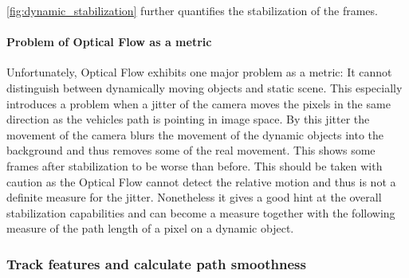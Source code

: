 \autoref{fig:dynamic_stabilization} further quantifies the stabilization of the frames.

\paragraph{Problem of Optical Flow as a metric}
Unfortunately, Optical Flow exhibits one major problem as a metric: 
It cannot distinguish between dynamically moving objects and static scene.
This especially introduces a problem when a jitter of the camera moves the pixels in the same direction as the vehicles path is pointing in image space.
By this jitter the movement of the camera blurs the movement of the dynamic objects into the background and thus removes some of the real movement.
This shows some frames after stabilization to be worse than before. 
This should be taken with caution as the Optical Flow cannot detect the relative motion and thus is not a definite measure for the jitter.
Nonetheless it gives a good hint at the overall stabilization capabilities and can become a measure together with the following measure of the path length of a pixel on a dynamic object. 

\subsubsection{Track features and calculate path smoothness}
